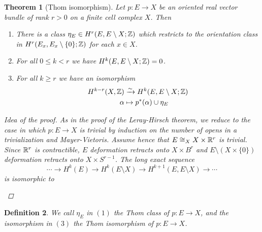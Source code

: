 \documentclass[A4paper, british]{amsart}
\theoremstyle{darkgreentheorem}
\newtheorem{thm}{Theorem}[section]
\theoremstyle{darkbluedefinition}
\newtheorem{defn}[thm]{Definition}
\theoremstyle{darkredexample}
\theoremstyle{remark}
\newcommand{\1}{\mathbbm{1}}
\newcommand{\ot}{\otimes}
\newcommand{\op}{\oplus}
\newcommand{\tms}{\times}
\begin{document}
\begin{thm}[Thom isomorphism]
    Let $p\colon E\to X$ be an oriented real vector bundle of rank $r>0$ on a finite cell complex $X$.
    Then
    \begin{enumerate}
	\item There is a class $\eta_{E}\in H^{r}(E,E\setminus X;\mathbb{Z})$ which restricts to the orientation class in $H^{r}(E_{x},E_{x}\setminus \{0\};\mathbb{Z})$ for each $x\in X$.
	\item For all $0\leqslant k<r$ we have $H^{k}(E,E\setminus X;\mathbb{Z})=0$.
	\item For all $k\geqslant r$ we have an isomorphism
	    \begin{align*}
		H^{k-r}(X,\mathbb{Z}) & \xrightarrow{\sim} H^{k}(E,E\setminus X;\mathbb{Z}) \\
		\alpha & \mapsto p^{*}(\alpha)\cup \eta_{E}
	    \end{align*}
    \end{enumerate}
    \begin{proof}[Idea of the proof]
	As in the proof of the Leray-Hirsch theorem, we reduce to the case in which $p\colon E\to X$ is trivial by induction on the number of opens in a trivialization and Mayer-Vietoris.
	Assume hence that $E\cong_{X} X\times \mathbb{R}^{r}$ is trivial.
	Since $\mathbb{R}^{r}$ is contractible, $E$ deformation retracts onto $X\times B^{r}$ and $E\setminus (X\times \{ 0\})$ deformation retracts onto $X\times S^{r-1}$.
	The long exact sequence
	\[ \cdots \to H^{k}(E)\to H^{k}(E\setminus X)\to H^{k+1}(E,E\setminus X)\to \cdots \]
	is isomorphic to
	\begin{center}
	\end{center}
    \end{proof}
\end{thm}

\begin{defn}
    We call $\eta_{E}$ in $(1)$ the \textit{Thom class} of $p\colon E\to X$, and the isomorphism in $(3)$ the \textit{Thom isomorphism} of $p\colon E\to X$.
\end{defn}
\end{document}
